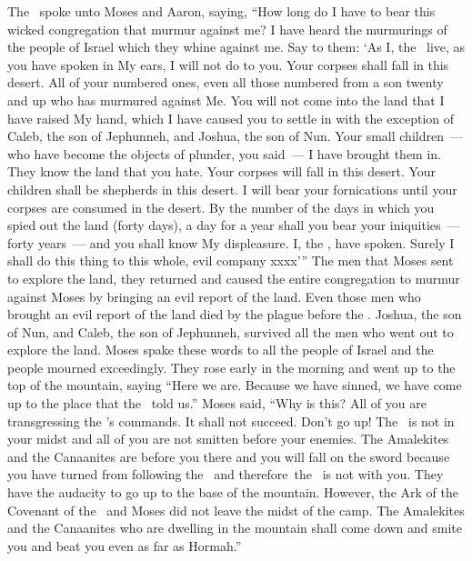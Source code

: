 \begin{inparaenum}
   The \lord\ spoke unto Moses and Aaron, saying,%
   ``How long do I have to bear this wicked congregation that murmur against me? I have heard the murmurings of the people of Israel which they whine against me.%
   Say to them: `As I, the \lord\ live, as you have spoken in My ears, I will not do to you.%
   Your corpses shall fall in this desert. All of your numbered ones, even all those numbered from a son twenty and up who has murmured against Me.%
   You will not come into the land that I have raised My hand, which I have caused you to settle in with the exception of Caleb, the son of Jephunneh, and Joshua, the son of Nun.%
   Your small children~--- who have become the objects of plunder, you said~--- I have brought them in. They know the land that you hate.%
   Your corpses will fall in this desert.%
   Your children shall be shepherds in this desert. I will bear your fornications until your corpses are consumed in the desert.%
   By the number of the days in which you spied out the land (forty days), a day for a year shall you bear your iniquities~--- forty years~--- and you shall know My displeasure.%
   I, the \lord, have spoken. Surely I shall do this thing to this whole, evil company xxxx'\thinspace''%
   The men that Moses sent to explore the land, they returned and caused the entire congregation to murmur against Moses by bringing an evil report of the land.%
   Even those men who brought an evil report of the land died by the plague before the \lord.%
   Joshua, the son of Nun, and Caleb, the son of Jephunneh, survived all the men who went out to explore the land.%
   Moses spake these words to all the people of Israel and the people mourned exceedingly.%
   They rose early in the morning and went up to the top of the mountain, saying ``Here we are. Because we have sinned, we have come up to the place that the \lord\ told us.''%
   Moses said, ``Why is this? All of you are transgressing the \lord's commands. It shall not succeed.%
   Don't go up! The \lord\ is not in your midst and all of you are not smitten before your enemies.%
   The Amalekites and the Canaanites are before you there and you will fall on the sword because you have turned from following the \lord\ and therefore\understood{}\ the \lord\ is not with you.%
   They have the audacity to go up to the base of the mountain. However, the Ark of the Covenant of the \lord\ and Moses did not leave the midst of the camp.%
   The Amalekites and the Canaanites who are dwelling in the mountain shall come down and smite you and beat you even as far as Hormah.''%
\end{inparaenum}
